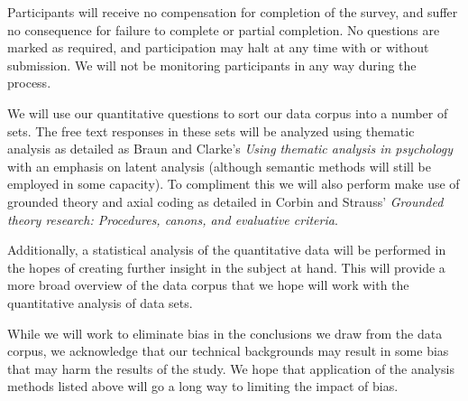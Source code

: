 \documentclass[]{article}
\begin{document}
    Participants will receive no compensation for completion of the survey, and suffer no consequence for failure to complete or partial completion. No questions are marked as required, and participation may halt at any time with or without submission. We will not be monitoring participants in any way during the process.

    We will use our quantitative questions to sort our data corpus into a number of sets. The free text responses in these sets will be analyzed using thematic analysis as detailed as Braun and Clarke's \emph{Using thematic analysis in psychology}\cite{doi:10.1191/1478088706qp063oa} with an emphasis on latent analysis (although semantic methods will still be employed in some capacity). To compliment this we will also perform make use of grounded theory and axial coding as detailed in Corbin and Strauss' \emph{Grounded theory research: Procedures, canons, and evaluative criteria}\cite{Corbin1990}.

    Additionally, a statistical analysis of the quantitative data will be performed in the hopes of creating further insight in the subject at hand. This will provide a more broad overview of the data corpus that we hope will work with the quantitative analysis of data sets.

    While we will work to eliminate bias in the conclusions we draw from the data corpus, we acknowledge that our technical backgrounds may result in some bias that may harm the results of the study. We hope that application of the analysis methods listed above will go a long way to limiting the impact of bias.

    \medskip

    
    
		
\end{document}
